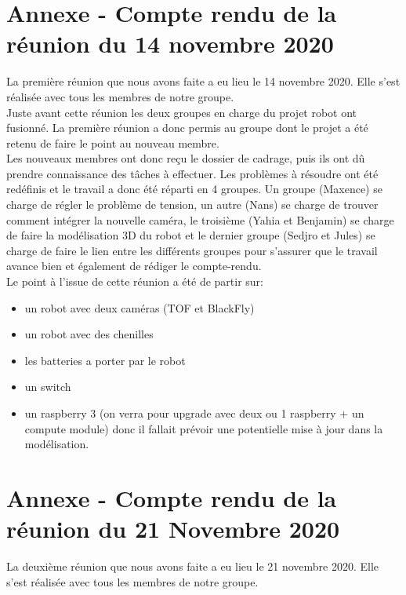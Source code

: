 \documentclass{PackagerQualityN}
\begin{document}
\appendix
\section*{Annexe - Compte rendu de la réunion du 14 novembre 2020}
La première réunion que nous avons faite a eu lieu le 14 novembre 2020. Elle s'est réalisée avec tous les membres de notre groupe.\\

Juste avant cette réunion les deux groupes en charge du projet robot ont fusionné. La première réunion a donc permis au groupe dont le projet a été retenu de faire le point au nouveau membre. \\

Les nouveaux membres ont donc reçu le dossier de cadrage, puis ils ont dû prendre connaissance des tâches à effectuer. Les problèmes à résoudre ont été redéfinis et le travail a donc été réparti en 4 groupes. Un groupe (Maxence) se charge de régler le problème de tension, un autre (Nans) se charge de trouver comment intégrer la nouvelle caméra, le troisième (Yahia et Benjamin) se charge de faire la modélisation 3D du robot et le dernier groupe (Sedjro et Jules) se charge de faire le lien entre les différents groupes pour s'assurer que le travail avance bien et également de rédiger le compte-rendu.\\

Le point à l'issue de cette réunion a été de partir sur:\\
\begin{itemize}
\item  un robot avec deux caméras (TOF et BlackFly)\\
\item   un robot avec des chenilles\\
\item  les batteries a porter par le robot\\
\item   un switch\\
\item   un raspberry 3 (on verra pour upgrade avec deux ou 1 raspberry + un compute module) donc il fallait prévoir une potentielle mise à jour dans la modélisation.
\end{itemize}

\newp
\section*{Annexe - Compte rendu de la réunion du 21 Novembre 2020}
La deuxième réunion que nous avons faite a eu lieu le 21 novembre 2020. Elle s'est réalisée avec tous les membres de notre groupe.\\
\end{document}
